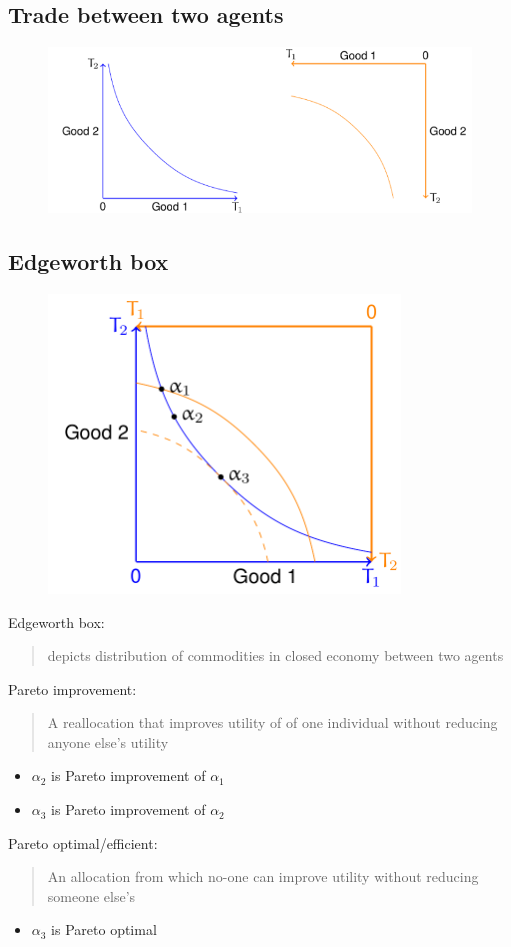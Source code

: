 \subsection{Trade between two agents}
\begin{figure}[H]
  \centering
  \includegraphics[width = \textwidth]{./img/figure6.png}
  \caption{}
\end{figure}
\subsection{Edgeworth box}
\begin{figure}[H]
  \centering
  \includegraphics[width =0.5 \textwidth]{./img/figure7.png}
  \caption{}
\end{figure}
Edgeworth box:
\begin{quote}
  depicts distribution of commodities in closed economy between two agents
\end{quote}
Pareto improvement:
\begin{quote}
  A reallocation that improves utility of of one individual without reducing anyone else's utility
\end{quote}
\begin{itemize}
  \item $\alpha_2$ is Pareto improvement of $\alpha_1$
  \item $\alpha_3$ is Pareto improvement of $\alpha_2$
\end{itemize}
Pareto optimal/efficient:
\begin{quote}
  An allocation from which no-one can improve utility without reducing someone else's
\end{quote}
\begin{itemize}
  \item $\alpha_3$ is Pareto optimal
\end{itemize}
